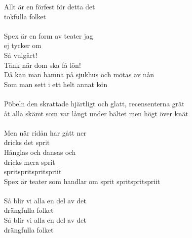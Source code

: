 \documentclass[a5paper,15pt]{article}
\begin{document}
Allt är en förfest för detta det \\tokfulla folket\\
\\
Spex är en form av teater jag \\ej tycker om\\ 
Så vulgärt! \\Tänk när dom ska få lön! \\
Då kan man hamna på sjukhus och mötas av nån \\
Som man sett i ett helt annat kön\\
\\
Pöbeln den skrattade hjärtligt och glatt, recensenterna grät\\
åt alla skämt som var långt under bältet men högt över knät\\
\\
Men när ridån har gått ner \\dricks det sprit\\
Hånglas och dansas och \\dricks mera sprit\\
spritspritspritspriit \\
Spex är teater som handlar om sprit spritspritspriit\\ 
\\
Så blir vi alla en del av det \\drängfulla folket\\
Så blir vi alla en del av det \\drängfulla folket\\
\\
\end{document}
